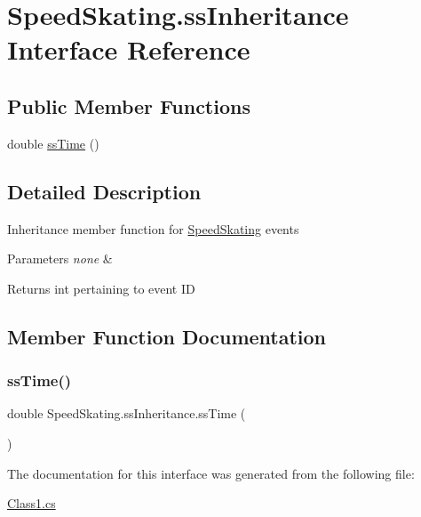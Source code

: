\hypertarget{interfaceSpeedSkating_1_1ssInheritance}{}\section{Speed\+Skating.\+ss\+Inheritance Interface Reference}
\label{interfaceSpeedSkating_1_1ssInheritance}
\subsection*{Public Member Functions}
\begin{DoxyCompactItemize}
\item 
double \hyperlink{interfaceSpeedSkating_1_1ssInheritance_a4227e9d2c0ed0c727d7d1ab0d3f59396}{ss\+Time} ()
\end{DoxyCompactItemize}


\subsection{Detailed Description}
Inheritance member function for \hyperlink{classSpeedSkating}{Speed\+Skating} events 
\begin{DoxyParams}{Parameters}
{\em none} & \\
\hline
\end{DoxyParams}
\begin{DoxyReturn}{Returns}
int pertaining to event ID 
\end{DoxyReturn}


\subsection{Member Function Documentation}
\mbox{\label{interfaceSpeedSkating_1_1ssInheritance_a4227e9d2c0ed0c727d7d1ab0d3f59396}} 
\subsubsection{\texorpdfstring{ss\+Time()}{ssTime()}}
{\footnotesize\ttfamily double Speed\+Skating.\+ss\+Inheritance.\+ss\+Time (\begin{DoxyParamCaption}{ }\end{DoxyParamCaption})}



The documentation for this interface was generated from the following file\+:\begin{DoxyCompactItemize}
\item 
\hyperlink{Class1_8cs}{Class1.\+cs}\end{DoxyCompactItemize}
